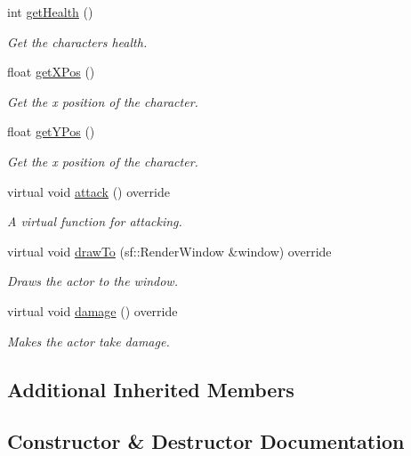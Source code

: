 \begin{DoxyCompactItemize}
int \mbox{\hyperlink{classRose_1_1Character_1_1Link_a75a15e36178c1b7bc84bec5f969d3369}{get\+Health}} ()
\begin{DoxyCompactList}\small\item\em Get the characters health. \end{DoxyCompactList}\item 
float \mbox{\hyperlink{classRose_1_1Character_1_1Link_a9ea9b1c4b96926fb066a3729102a249d}{get\+X\+Pos}} ()
\begin{DoxyCompactList}\small\item\em Get the x position of the character. \end{DoxyCompactList}\item 
float \mbox{\hyperlink{classRose_1_1Character_1_1Link_aa9ca41c35449ee5cb0c5b666f5f57b9b}{get\+Y\+Pos}} ()
\begin{DoxyCompactList}\small\item\em Get the x position of the character. \end{DoxyCompactList}\item 
virtual void \mbox{\hyperlink{classRose_1_1Character_1_1Link_af22163dcc690bbbfdc9425aff8074766}{attack}} () override
\begin{DoxyCompactList}\small\item\em A virtual function for attacking. \end{DoxyCompactList}\item 
virtual void \mbox{\hyperlink{classRose_1_1Character_1_1Link_a7992daadbfc55011376b94604909668c}{draw\+To}} (sf\+::\+Render\+Window \&window) override
\begin{DoxyCompactList}\small\item\em Draws the actor to the window. \end{DoxyCompactList}\item 
virtual void \mbox{\hyperlink{classRose_1_1Character_1_1Link_a7918cd89bf9da3eced41055567c7c27c}{damage}} () override
\begin{DoxyCompactList}\small\item\em Makes the actor take damage. \end{DoxyCompactList}\end{DoxyCompactItemize}
\subsection*{Additional Inherited Members}


\subsection{Constructor \& Destructor Documentation}
\mbox{\label{classRose_1_1Character_1_1Link_ac8ea34310b94a7be6738893244d4634e}} 
